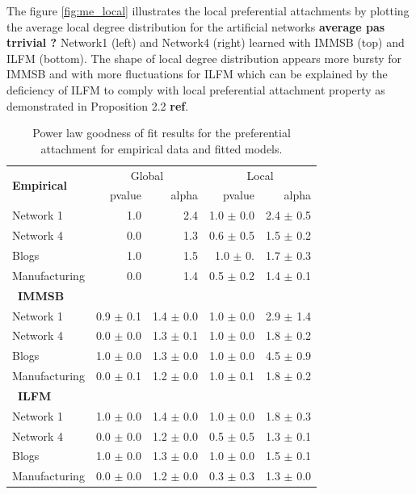 The figure \ref{fig:me_local} illustrates the local preferential attachments by plotting the average local degree distribution for the artificial networks \textbf{average pas trrivial ?}  Network1 (left) and Network4 (right) learned with IMMSB (top) and ILFM (bottom). The shape of local degree distribution appears more bursty for IMMSB and with more fluctuations for ILFM which can be explained by the deficiency of ILFM to comply with local preferential attachment property as demonstrated in Proposition 2.2 \textbf{ref}.
 
 

\begin{table}[t]
    \caption{Power law goodness of fit results for the preferential attachment for empirical data and fitted models.}
\centering
  \begin{tabular}{lrrrr}
      \multirow{2}{*}{\textbf{Empirical}}  &
      \multicolumn{2}{c}{Global} & \multicolumn{2}{c}{Local}\\
      \cmidrule(r){2-3} \cmidrule(l){4-5}
      &   pvalue &   alpha   & pvalue & alpha   \\
  	\hline
    Network 1     &    1.0 &   2.4 & 1.0 $\pm$ 0.0  &  2.4 $\pm$ 0.5  \\
    Network 4     &    0.0 &   1.3 & 0.6 $\pm$ 0.5  &  1.5 $\pm$ 0.2 \\
    Blogs         &    1.0 &   1.5 & 1.0 $\pm$ 0.   &  1.7 $\pm$ 0.3 \\
    Manufacturing &    0.0 &   1.4 & 0.5 $\pm$ 0.2  &  1.4 $\pm$ 0.1 \\
  	\hline

      \ \textbf{IMMSB} &&&& \\
  	\hline
    Network 1     & 0.9 \(\pm\) 0.1   & 1.4 \(\pm\) 0.0 & 1.0 \(\pm\) 0.0   & 2.9 \(\pm\) 1.4 \\
    Network 4     & 0.0 \(\pm\) 0.0   & 1.3 \(\pm\) 0.1 & 1.0 \(\pm\) 0.0   & 1.8 \(\pm\) 0.2 \\
    Blogs         & 1.0 \(\pm\) 0.0   & 1.3 \(\pm\) 0.0 & 1.0 \(\pm\) 0.0   & 4.5 \(\pm\) 0.9 \\
    Manufacturing & 0.0 \(\pm\) 0.1   & 1.2 \(\pm\) 0.0 & 1.0 \(\pm\) 0.1   & 1.8 \(\pm\) 0.2 \\
  	\hline

      \ \textbf{ILFM} &&&& \\
  	\hline
    Network 1     & 1.0 \(\pm\) 0.0 & 1.4 \(\pm\) 0.0 & 1.0 \(\pm\) 0.0 & 1.8 \(\pm\) 0.3 \\
    Network 4     & 0.0 \(\pm\) 0.0 & 1.2 \(\pm\) 0.0 & 0.5 \(\pm\) 0.5 & 1.3 \(\pm\) 0.1 \\
    Blogs         & 1.0 \(\pm\) 0.0 & 1.3 \(\pm\) 0.0 & 1.0 \(\pm\) 0.0 & 1.5 \(\pm\) 0.1 \\
    Manufacturing & 0.0 \(\pm\) 0.0 & 1.2 \(\pm\) 0.0 & 0.3 \(\pm\) 0.3 & 1.3 \(\pm\) 0.0 \\
  	\hline
  \end{tabular}
\label{table:me_gofit}
\end{table}

